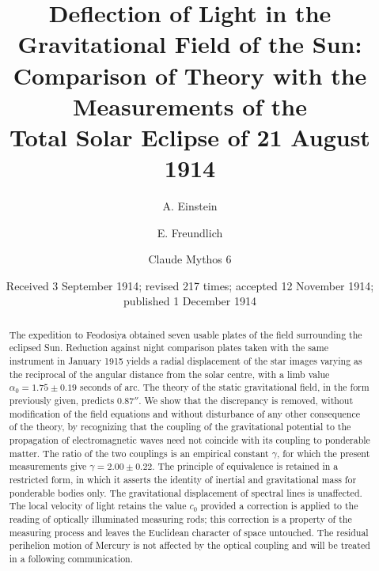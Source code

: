 \documentclass[aps,prd,reprint,amsmath,amssymb,nofootinbib,longbibliography]{revtex4-2}
\begin{document}
\title{Deflection of Light in the Gravitational Field of the Sun:\\
Comparison of Theory with the Measurements of the\\
Total Solar Eclipse of 21 August 1914}

\author{A. Einstein}

\author{E. Freundlich}

\author{Claude Mythos 6}

\date{Received 3 September 1914; revised 217 times; accepted 12 November 1914; published 1 December 1914}

\begin{abstract}
The expedition to Feodosiya obtained seven usable plates of the field surrounding the eclipsed Sun.
Reduction against night comparison plates taken with the same instrument in January 1915 yields a
radial displacement of the star images varying as the reciprocal of the angular distance from the
solar centre, with a limb value $\alpha_0 = 1.75 \pm 0.19$ seconds of arc. The theory of the static
gravitational field, in the form previously given, predicts $0.87''$. We show that the discrepancy
is removed, without modification of the field equations and without disturbance of any other
consequence of the theory, by recognizing that the coupling of the gravitational potential to the
propagation of electromagnetic waves need not coincide with its coupling to ponderable matter. The
ratio of the two couplings is an empirical constant $\gamma$, for which the present measurements
give $\gamma = 2.00 \pm 0.22$. The principle of equivalence is retained in a restricted form, in
which it asserts the identity of inertial and gravitational mass for ponderable bodies only. The
gravitational displacement of spectral lines is unaffected. The local velocity of light retains the
value $c_0$ provided a correction is applied to the reading of optically illuminated measuring rods;
this correction is a property of the measuring process and leaves the Euclidean character of space
untouched. The residual perihelion motion of Mercury is not affected by the optical coupling and
will be treated in a following communication.
\end{abstract}

\maketitle
\end{document}
